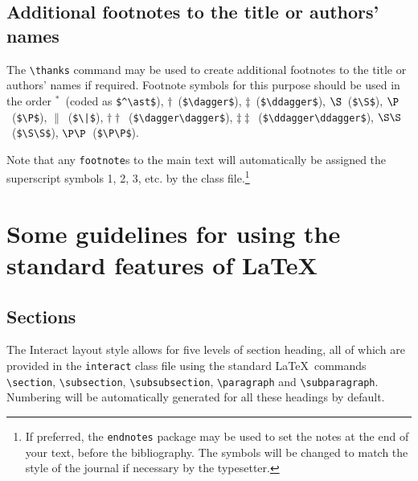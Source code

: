 \documentclass[]{interact}
\theoremstyle{plain}%
\theoremstyle{definition}
\theoremstyle{remark}
\begin{document}
\subsection{Additional footnotes to the title or authors' names}

The \verb"\thanks" command may be used to create additional footnotes to the title or authors' names if required. Footnote symbols for this purpose should be used in the order
$^\ast$~(coded as \verb"$^\ast$"), $\dagger$~(\verb"$\dagger$"), $\ddagger$~(\verb"$\ddagger$"), $\S$~(\verb"$\S$"), $\P$~(\verb"$\P$"), $\|$~(\verb"$\|$"),
$\dagger\dagger$~(\verb"$\dagger\dagger$"), $\ddagger\ddagger$~(\verb"$\ddagger\ddagger$"), $\S\S$~(\verb"$\S\S$"), $\P\P$~(\verb"$\P\P$").

Note that any \verb"footnote"s to the main text will automatically be assigned the superscript symbols 1, 2, 3, etc. by the class file.\footnote{If preferred, the \texttt{endnotes} package may be used to set the notes at the end of your text, before the bibliography. The symbols will be changed to match the style of the journal if necessary by the typesetter.}


\section{Some guidelines for using the standard features of \LaTeX}

\subsection{Sections}

The \textsf{Interact} layout style allows for five levels of section heading, all of which are provided in the \texttt{interact} class file using the standard \LaTeX\ commands \verb"\section", \verb"\subsection", \verb"\subsubsection", \verb"\paragraph" and \verb"\subparagraph". Numbering will be automatically generated for all these headings by default.
\end{document}
